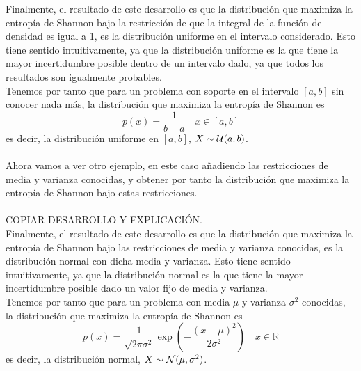 \noindent
Finalmente, el resultado de este desarrollo es que la distribución que maximiza la entropía de Shannon bajo la restricción de que la integral de la función de densidad es igual a 1, es la distribución uniforme en el intervalo considerado. Esto tiene sentido intuitivamente, ya que la distribución uniforme es la que tiene la mayor incertidumbre posible dentro de un intervalo dado, ya que todos los resultados son igualmente probables. \\
\noindent
Tenemos por tanto que para un problema con soporte en el intervalo $[a,b]$ sin conocer nada más, la distribución que maximiza la entropía de Shannon es
\begin{equation*}
    p(x) = \dfrac{1}{b-a} \quad x \in [a,b]
\end{equation*}
es decir, la distribución uniforme en $[a,b]$, $X\sim \mathcal{U}(a,b)$. \\ \\
\noindent
Ahora vamos a ver otro ejemplo, en este caso añadiendo las restricciones de media y varianza conocidas, y obtener por tanto la distribución que maximiza la entropía de Shannon bajo estas restricciones. \\ \\

\noindent
COPIAR DESARROLLO Y EXPLICACIÓN. \\

\noindent
Finalmente, el resultado de este desarrollo es que la distribución que maximiza la entropía de Shannon bajo las restricciones de media y varianza conocidas, es la distribución normal con dicha media y varianza. Esto tiene sentido intuitivamente, ya que la distribución normal es la que tiene la mayor incertidumbre posible dado un valor fijo de media y varianza. \\
\noindent
Tenemos por tanto que para un problema con media $\mu$ y varianza $\sigma^2$ conocidas, la distribución que maximiza la entropía de Shannon es
\begin{equation*}
    p(x) = \dfrac{1}{\sqrt{2\pi \sigma^2}} \exp\left( -\dfrac{(x-\mu)^2}{2\sigma^2} \right) \quad x \in \mathbb{R}
\end{equation*}
es decir, la distribución normal, $X\sim \mathcal{N}(\mu,\sigma^2)$. \\


